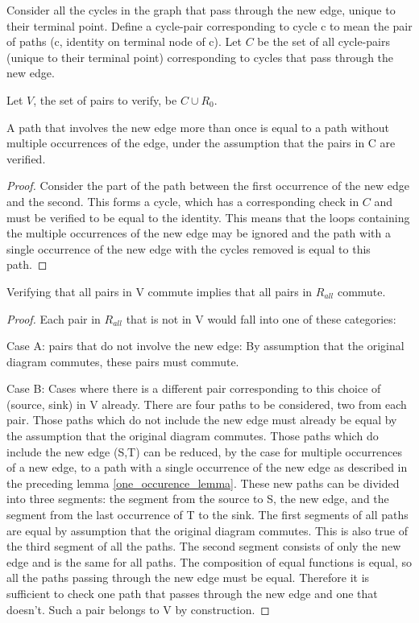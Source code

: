 \documentclass[sigplan,review,anonymous]{acmart}
\begin{document}
{Consider all the cycles in the graph that pass through the new edge, unique to their terminal point.
Define a cycle-pair corresponding to cycle c to mean the pair of paths (c, identity on terminal node of c).
Let $C$ be the set of all cycle-pairs (unique to their terminal point) corresponding to cycles that pass through the new edge.

Let $V$, the set of pairs to verify, be $C \cup R_0$.

\begin{lemma}
\label{one_occurence_lemma}
A path that involves the new edge more than once is equal to a path without multiple occurrences of the edge, under the assumption that the pairs in C are verified.
\end{lemma}
\begin{proof}
Consider the part of the path between the first occurrence of the new edge and the second. This forms a cycle, which has a corresponding check in $C$ and must be verified to be equal to the identity.
This means that the loops containing the multiple occurrences of the new edge may be ignored and the path with a single occurrence of the new edge with the cycles removed is equal to this path.
\end{proof}

\begin{theorem}
\label{verifyingSet}
Verifying that all pairs in V commute implies that all pairs in $R_{all}$ commute.
\end{theorem}
\begin{proof}

Each pair in $R_{all}$ that is not in V would fall into one of these categories:

Case A: pairs that do not involve the new edge: By assumption that the original diagram commutes, these pairs must commute.

Case B: Cases where there is a different pair corresponding to this choice of (source, sink) in V already.
There are four paths to be considered, two from each pair. Those paths which do not include the new edge must already be equal by the assumption that the original diagram commutes.
Those paths which do include the new edge (S,T) can be reduced, by the case for multiple occurrences of a new edge, to a path with a single occurrence of the new edge as described in the preceding lemma \ref{one_occurence_lemma}. These new paths can be divided into three segments: the segment from the source to S, the new edge, and the segment from the last occurrence of T to the sink. The first segments of all paths are equal by assumption that the original diagram commutes. This is also true of the third segment of all the paths. The second segment consists of only the new edge and is the same for all paths. The composition of equal functions is equal, so all the paths passing through the new edge must be equal.
Therefore it is sufficient to check one path that passes through the new edge and one that doesn't. Such a pair belongs to V by construction.
\end{proof}

}
\end{document}
